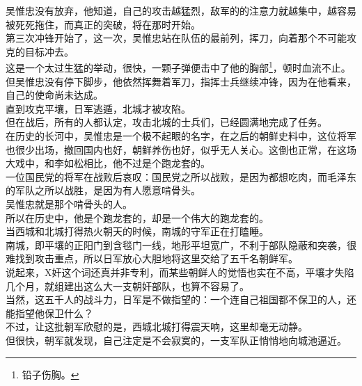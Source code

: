 \begin{multicols}{\theparacolNo}
吴惟忠没有放弃，他知道，自己的攻击越猛烈，敌军的的注意力就越集中，越容易被死死拖住，而真正的突破，将在那时开始。\\

第三次冲锋开始了，这一次，吴惟忠站在队伍的最前列，挥刀，向着那个不可能攻克的目标冲去。\\

这是一个太过生猛的举动，很快，一颗子弹便击中了他的胸部\footnote{铅子伤胸。}，顿时血流不止。\\

但吴惟忠没有停下脚步，他依然挥舞着军刀，指挥士兵继续冲锋，因为在他看来，自己的使命尚未达成。\\

直到攻克平壤，日军逃遁，北城才被攻陷。\\

但在战后，所有的人都认定，攻击北城的士兵们，已经圆满地完成了任务。\\

在历史的长河中，吴惟忠是一个极不起眼的名字，在之后的朝鲜史料中，这位将军也很少出场，撤回国内也好，朝鲜养伤也好，似乎无人关心。这倒也正常，在这场大戏中，和李如松相比，他不过是个跑龙套的。\\

一位国民党的将军在战败后哀叹：国民党之所以战败，是因为都想吃肉，而毛泽东的军队之所以战胜，是因为有人愿意啃骨头。\\

吴惟忠就是那个啃骨头的人。\\

所以在历史中，他是个跑龙套的，却是一个伟大的跑龙套的。\\

当西城和北城打得热火朝天的时候，南城的守军正在打瞌睡。\\

南城，即平壤的正阳门到含毯门一线，地形平坦宽广，不利于部队隐蔽和突袭，很难找到攻击重点，所以日军放心大胆地将这里交给了五千名朝鲜军。\\

说起来，X奸这个词还真并非专利，而某些朝鲜人的觉悟也实在不高，平壤才失陷几个月，就组建出这么大一支朝奸部队，也算不容易了。\\

当然，这五千人的战斗力，日军是不做指望的：一个连自己祖国都不保卫的人，还能指望他保卫什么？\\

不过，让这批朝军欣慰的是，西城北城打得震天响，这里却毫无动静。\\

但很快，朝军就发现，自己注定是不会寂寞的，一支军队正悄悄地向城池逼近。\\


\end{multicols}
